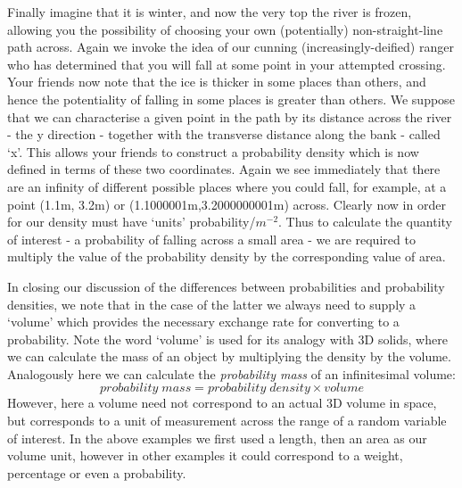 \documentclass[11pt,fullpage]{book}
\begin{document}
Finally imagine that it is winter, and now the very top the river is frozen, allowing you the possibility of choosing your own (potentially) non-straight-line path across. Again we invoke the idea of our cunning (increasingly-deified) ranger who has determined that you will fall at some point in your attempted crossing. Your friends now note that the ice is thicker in some places than others, and hence the potentiality of falling in some places is greater than others. We suppose that we can characterise a given point in the path by its distance across the river - the y direction - together with the transverse distance along the bank - called `x'. This allows your friends to construct a probability density which is now defined in terms of these two coordinates. Again we see immediately that there are an infinity of different possible places where you could fall, for example, at a point (1.1m, 3.2m) or (1.1000001m,3.2000000001m) across. Clearly now in order for our density must have `units' probability/$m^{-2}$. Thus to calculate the quantity of interest - a probability of falling across a small area - we are required to multiply the value of the probability density by the corresponding value of area. 

In closing our discussion of the differences between probabilities and probability densities, we note that in the case of the latter we always need to supply a `volume' which provides the necessary exchange rate for converting to a probability. Note the word `volume' is used for its analogy with 3D solids, where we can calculate the mass of an object by multiplying the density by the volume. Analogously here we can calculate the \textit{probability mass} of an infinitesimal volume:
%
\begin{equation}
probability\; mass = probability\; density \times volume
\end{equation}
%
However, here a volume need not correspond to an actual 3D volume in space, but corresponds to a unit of measurement across the range of a random variable of interest. In the above examples we first used a length, then an area as our volume unit, however in other examples it could correspond to a weight, percentage or even a probability.
\end{document}
